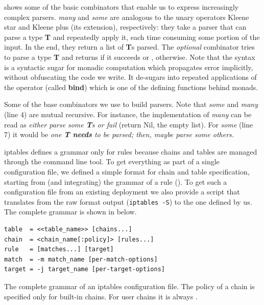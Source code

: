  shows some of the basic combinators
that enable us to express increasingly complex parsers.  \emph{many} and
\emph{some} are analogous to the unary operators Kleene star and Kleene plus
(its extension), respectively: they take a parser that can parse a type
\textbf{T} and repeatedly apply it, each time consuming some portion of the
input.  In the end, they return a list of \textbf{T}s parsed.  The
\emph{optional} combinator tries to parse a type \textbf{T} and returns
 if it succeeds or , otherwise.  Note that the
 syntax is a syntactic sugar for monadic computation which
propagates error implicitly, without obfuscating the code we write.  It
de-sugars into repeated applications of the \hlmath{$>>=$} operator (called
\textbf{bind}) which is one of the defining functions behind monads.

\begin{listing}[H]
  \caption[Some of the base combinators we use to build parsers.]{Some of the
  base combinators we use to build parsers.  Note that \emph{some} and
  \emph{many} (line 4) are mutual recursive.  For instance, the implementation
  of \emph{many} can be read as \emph{either parse some \textbf{T}s or fail}
  (return Nil, the empty list).  For \emph{some} (line 7) it would be \emph{one
  \textbf{T needs} to be parsed; then, maybe parse some others.}}
  \label{lst:combinators}
\end{listing}

iptables defines a grammar only for rules because chains and tables are managed
through the command line tool.  To get everything as part of a single
configuration file, we defined a simple format for chain and table
specification, starting from (and integrating) the grammar of a rule
().  To get such a configuration file
from an existing deployment we also provide a script that translates from the
raw format output (\texttt{iptables -S}) to the one defined by us.  The
complete grammar is shown in  below.

\begin{listing}
  \small
  \lstset{numbers=none, frame=single, basicstyle=\ttfamily,
    xleftmargin=0.15\textwidth, xrightmargin=0.15\textwidth
  }
  \begin{lstlisting}
table  = <<table_name>> [chains...]
chain  = <chain_name[:policy]> [rules...]
rule   = [matches...] [target]
match  = -m match_name [per-match-options]
target = -j target_name [per-target-options]
  \end{lstlisting}
  \caption{The complete grammar of an iptables configuration file.  The policy
  of a chain is specified only for built-in chains.  For user chains it is
  always \RETURN.}
  \label{lst:our-grammar}
\end{listing}

